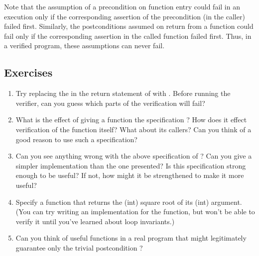 Note that the assumption of a precondition on function entry could
fail in an execution only if the corresponding assertion of the
precondition (in the caller) failed first. Similarly, the
postconditions assumed on return from a function could fail only if
the corresponding assertion in the called function failed first. Thus,
in a verified program, these assumptions can never fail.

\subsection*{Exercises}
\begin{enumerate}
\item
Try replacing the \vcc{<} in the return statement of  with
\vcc{>}. Before running the verifier, can you guess which parts of the
verification will fail?

\item
What is the effect of giving a function the specification
 ? How does it effect verification of
the function itself? What about its callers? Can you think of a good 
reason to use such a specification?


\item
Can you see anything wrong with the above specification of ?
Can you give a simpler implementation than the one presented? Is this 
specification strong enough to be useful? If not, how might it be
strengthened to make it more useful?

\item
Specify a function that returns the (int) square root of its (int)
argument. (You can try writing an implementation for the function, but
won't be able to verify it until you've learned about loop
invariants.)

\item
Can you think of useful functions in a real program that might
legitimately guarantee only the trivial postcondition ?
\end{enumerate}

